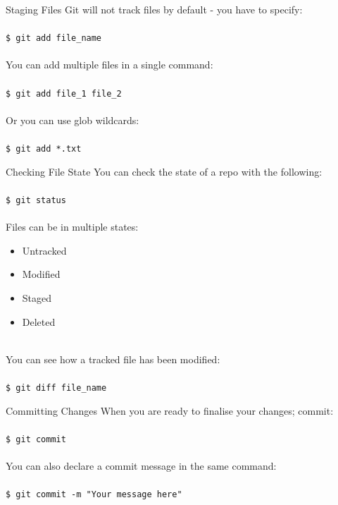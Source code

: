 \documentclass{beamer}
\begin{document}
\begin{frame}{Staging Files}
    Git will not track files by default - you have to specify: \\~\\
    {\tt \$ git add file\_name} \\~\\
    You can add multiple files in a single command: \\~\\
    {\tt \$ git add file\_1 file\_2} \\~\\
    Or you can use glob wildcards: \\~\\
    {\tt \$ git add *.txt}
\end{frame}

\begin{frame}{Checking File State}
    You can check the state of a repo with the following: \\~\\
    {\tt \$ git status} \\~\\
    Files can be in multiple states:
    \begin{itemize}
        \item Untracked
        \item Modified
        \item Staged
        \item Deleted\\~\\
    \end{itemize}
    You can see how a tracked file has been modified: \\~\\
    {\tt \$ git diff file\_name}
\end{frame}

\begin{frame}{Committing Changes}
    When you are ready to finalise your changes; commit: \\~\\
    {\tt \$ git commit} \\~\\
    You can also declare a commit message in the same command: \\~\\
    {\tt \$ git commit -m "Your message here"}
\end{frame}
\end{document}
